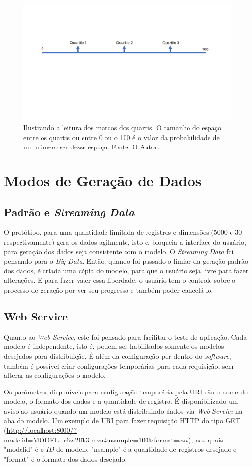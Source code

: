 \documentclass[
	12pt,				%
	openright,			%
	twoside,			%
	a4paper,			%
	english,			%
	brazil				%
	]{abntex2}
\begin{document}
		\begin{figure}[h]
			\centering
			\includegraphics[width=\linewidth]{./figures/prototipo/quartil.png}
			\caption{Ilustrando a leitura dos marcos dos quartis. O tamanho do espaço entre os quartis ou entre 0 ou o 100 é o valor da probabilidade de um número ser desse espaço. Fonte: O Autor.}
			\label{fig:leituraMarco}
		\end{figure}
	\section{Modos de Geração de Dados}

		\subsection{Padrão e \emph{Streaming Data}}
		O protótipo, para uma quantidade limitada de registros e dimensões (5000 e 30 respectivamente) gera os dados agilmente, isto é, bloqueia a interface do usuário, para geração dos dados seja consistente com o modelo.
		O \emph{Streaming Data} foi pensando para o \emph{Big Data}. Então, quando foi passado o limiar da geração padrão dos dados, é criada uma cópia do modelo, para que o usuário seja livre para fazer alterações.
		E para fazer valer essa liberdade, o usuário tem o controle sobre o processo de geração por ver seu progresso e também poder cancelá-lo.
		\subsection{Web Service}
		Quanto ao \emph{Web Service}, este foi pensado para facilitar o teste de aplicação.
		Cada modelo é independente, isto é, podem ser habilitados somente os modelos desejados para distribuição.
		É além da configuração por dentro do \emph{software}, também é possível criar configurações temporárias para cada requisição, sem alterar as configurações o modelo.
		\par
		Os parâmetros disponíveis para configuração temporária pela URI são o nome do modelo, o formato dos dados e a quantidade de registro.
		É disponibilizado um aviso ao usuário quando um modelo está distribuindo dados via \emph{Web Service} na aba do modelo.
		Um exemplo de URI para fazer requisição HTTP do tipo GET (\url{http://localhost:8000/?modelid=MODEL_r6w2ffk3.mva&nsample=100&format=csv}), nos quais "modelid" é o \emph{ID} do modelo, "nsample" é a quantidade de registros desejado e "format" é o formato dos dados desejado.
	 
\end{document}

